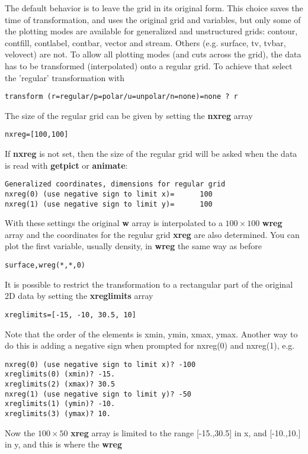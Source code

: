    The default behavior is to leave the grid in its original form.
   This choice saves the time of transformation, and uses the original grid 
   and variables, but only some of the plotting modes are available for 
   generalized and unstructured grids: contour, contfill, contlabel, contbar,
   vector and stream. Others (e.g. surface, tv, tvbar, velovect) are not.
   To allow all plotting modes (and cuts across the grid), the data
   has to be transformed (interpolated) onto a regular grid.
   To achieve that select the 'regular' transformation with
\begin{verbatim}
transform (r=regular/p=polar/u=unpolar/n=none)=none ? r
\end{verbatim}
   The size of the regular grid can be given by setting the {\bf nxreg} array
\begin{verbatim}
nxreg=[100,100]
\end{verbatim}
   If {\bf nxreg} is not set, then  the size of the regular grid will be asked
   when the data is read with {\bf getpict} or {\bf animate}:
\begin{verbatim}
Generalized coordinates, dimensions for regular grid
nxreg(0) (use negative sign to limit x)=      100
nxreg(1) (use negative sign to limit y)=      100
\end{verbatim}
   With these settings the original {\bf w} array is interpolated to 
   a $100\times100$ {\bf wreg} array and the
   coordinates for the regular grid {\bf xreg} are also determined. 
   You can plot the first variable, usually density, in {\bf wreg} the 
   same way as before
\begin{verbatim}
surface,wreg(*,*,0)
\end{verbatim}
   It is possible to restrict the transformation to a rectangular
   part of the original 2D data by setting the {\bf xreglimits} array
\begin{verbatim}
xreglimits=[-15, -10, 30.5, 10]
\end{verbatim}
   Note that the order of the elements is xmin, ymin, xmax, ymax.
   Another way to do this is adding a negative sign when prompted for 
   nxreg(0) and nxreg(1), e.g.
\begin{verbatim}
nxreg(0) (use negative sign to limit x)? -100
xreglimits(0) (xmin)? -15.
xreglimits(2) (xmax)? 30.5
nxreg(1) (use negative sign to limit y)? -50
xreglimits(1) (ymin)? -10.
xreglimits(3) (ymax)? 10.
\end{verbatim}
   Now the $100\times 50$ {\bf xreg} array is limited to the range 
   [-15.,30.5] in x, and [-10.,10.] in y, and this is where the {\bf wreg} 
